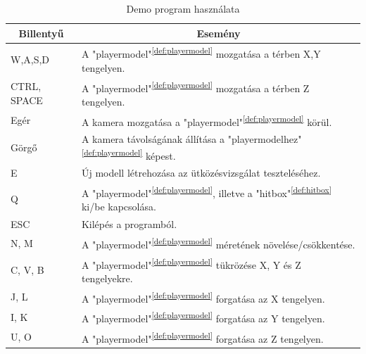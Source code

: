 \begin{table}[h]
	\centering
	\begin{tabular}{|l|l|}
		\hline
		\multicolumn{1}{|c|}{\textbf{Billentyű}} & \multicolumn{1}{c|}{\textbf{Esemény}}\\
		\hline
		W,A,S,D & {A "playermodel"\textsuperscript{\ref{def:playermodel}} mozgatása a térben X,Y tengelyen.} \\\hline
		CTRL, SPACE & A "playermodel"\textsuperscript{\ref{def:playermodel}} mozgatása a térben Z tengelyen. \\\hline
		Egér & A kamera mozgatása a "playermodel"\textsuperscript{\ref{def:playermodel}} körül. \\\hline
		Görgő & A kamera távolságának állítása a "playermodelhez"\textsuperscript{\ref{def:playermodel}} képest. \\\hline
		E & Új modell létrehozása az ütközésvizsgálat teszteléséhez. \\\hline
		Q & A "playermodel"\textsuperscript{\ref{def:playermodel}}, illetve a "hitbox"\textsuperscript{\ref{def:hitbox}} ki/be kapcsolása. \\\hline
		ESC & Kilépés a programból. \\\hline
		N, M & A "playermodel"\textsuperscript{\ref{def:playermodel}} méretének növelése/csökkentése. \\\hline
		C, V, B & A "playermodel"\textsuperscript{\ref{def:playermodel}} tükrözése X, Y és Z tengelyekre. \\\hline
		J, L & A "playermodel"\textsuperscript{\ref{def:playermodel}} forgatása az X tengelyen. \\\hline
		I, K & A "playermodel"\textsuperscript{\ref{def:playermodel}} forgatása az Y tengelyen. \\\hline
		U, O & A "playermodel"\textsuperscript{\ref{def:playermodel}} forgatása az Z tengelyen. \\\hline
	\end{tabular}
	\caption{Demo program használata}
	\label{tab:demo}
\end{table}

\newpage
